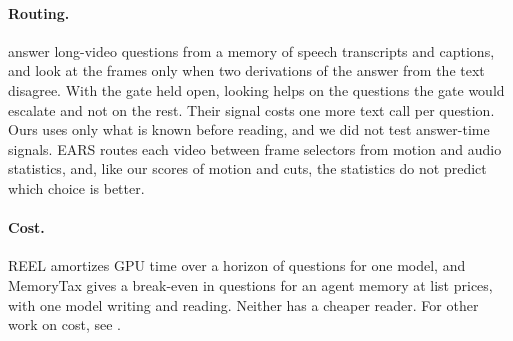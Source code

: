 \documentclass[11pt]{article}
\begin{document}
\paragraph{Routing.} \citet{readfirst} answer long-video questions from a memory of speech transcripts and captions, and look at the frames only when two derivations of the answer from the text disagree. With the gate held open, looking helps on the questions the gate would escalate and not on the rest. Their signal costs one more text call per question. Ours uses only what is known before reading, and we did not test answer-time signals. EARS \citep{ears} routes each video between frame selectors from motion and audio statistics, and, like our scores of motion and cuts, the statistics do not predict which choice is better.

\paragraph{Cost.} REEL \citep{reel} amortizes GPU time over a horizon of questions for one model, and MemoryTax \citep{memorytax} gives a break-even in questions for an agent memory at list prices, with one model writing and reading. Neither has a cheaper reader. For other work on cost, see \citet{mit3,remembr,lohi,vei,agentsmatter}.
\end{document}
